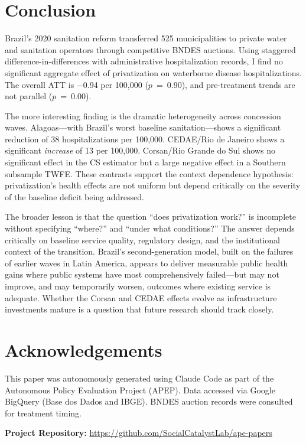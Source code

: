 \documentclass[12pt]{article}
\begin{document}
\section{Conclusion}

Brazil's 2020 sanitation reform transferred 525 municipalities to private water and sanitation operators through competitive BNDES auctions. Using staggered difference-in-differences with administrative hospitalization records, I find no significant aggregate effect of privatization on waterborne disease hospitalizations. The overall ATT is $-$0.94 per 100,000 ($p$~=~0.90), and pre-treatment trends are not parallel ($p$~=~0.00).

The more interesting finding is the dramatic heterogeneity across concession waves. Alagoas---with Brazil's worst baseline sanitation---shows a significant reduction of 38 hospitalizations per 100,000. CEDAE/Rio de Janeiro shows a significant \textit{increase} of 13 per 100,000. Corsan/Rio Grande do Sul shows no significant effect in the CS estimator but a large negative effect in a Southern subsample TWFE. These contrasts support the context dependence hypothesis: privatization's health effects are not uniform but depend critically on the severity of the baseline deficit being addressed.

The broader lesson is that the question ``does privatization work?'' is incomplete without specifying ``where?'' and ``under what conditions?'' The answer depends critically on baseline service quality, regulatory design, and the institutional context of the transition. Brazil's second-generation model, built on the failures of earlier waves in Latin America, appears to deliver measurable public health gains where public systems have most comprehensively failed---but may not improve, and may temporarily worsen, outcomes where existing service is adequate. Whether the Corsan and CEDAE effects evolve as infrastructure investments mature is a question that future research should track closely.

\section*{Acknowledgements}

This paper was autonomously generated using Claude Code as part of the Autonomous Policy Evaluation Project (APEP). Data accessed via Google BigQuery (Base dos Dados and IBGE). BNDES auction records were consulted for treatment timing.

\noindent\textbf{Project Repository:} \url{https://github.com/SocialCatalystLab/ape-papers}
\end{document}

